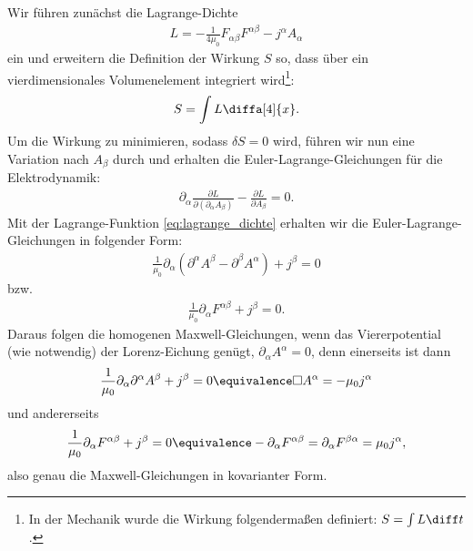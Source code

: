 Wir führen zunächst die Lagrange-Dichte
\begin{align}
    \label{eq:lagrange_dichte}
    L=-\frac{1}{4\mu_0}F_{\alpha\beta} F^{\alpha\beta}-j^\alpha A_\alpha
\end{align}
ein und erweitern die Definition der Wirkung $S$ so, dass über ein vierdimensionales Volumenelement integriert wird\footnote{In der Mechanik wurde die Wirkung folgendermaßen definiert: $S=\int L\diff t$.}:
\begin{align*}
    S=\int L \diffa[4]{x}.
\end{align*}
Um die Wirkung zu minimieren, sodass $\delta S=0$ wird, führen wir nun eine Variation nach $A_\beta$ durch und erhalten
die Euler-Lagrange-Gleichungen für die Elektrodynamik:
\begin{align*}
    \boxed{\partial_\alpha \frac{\partial L}{\partial(\partial_\alpha A_\beta)}-\frac{\partial L}{\partial A_\beta}=0}.
\end{align*}
Mit der Lagrange-Funktion \eqref{eq:lagrange_dichte} erhalten wir die Euler-Lagrange-Gleichungen in folgender Form:
\begin{align*}
    \boxed{\frac{1}{\mu_0}\partial_\alpha\left(\partial^\alpha A^\beta-\partial^\beta A^\alpha\right) + j^\beta=0}
\end{align*}
bzw.
\begin{align*}
    \boxed{\frac{1}{\mu_0}\partial_\alpha F^{\alpha\beta} + j^\beta=0.}
\end{align*}
Daraus folgen die homogenen Maxwell-Gleichungen, wenn das Viererpotential (wie notwendig) der Lorenz-Eichung genügt, $\partial_\alpha A^\alpha=0$, denn einerseits ist dann
\begin{align*}
    \frac{1}{\mu_0}\partial_\alpha\partial^\alpha A^\beta + j^\beta=0 \equivalence \Box A^\alpha=-\mu_0 j^\alpha
\end{align*}
und andererseits
\begin{align*}
    \frac{1}{\mu_0}\partial_\alpha F^{\alpha\beta} + j^\beta = 0 \equivalence -\partial_\alpha F^{\alpha\beta} = \partial_\alpha F^{\beta\alpha}=\mu_0 j^\alpha ,
\end{align*}
also genau die Maxwell-Gleichungen in kovarianter Form.




